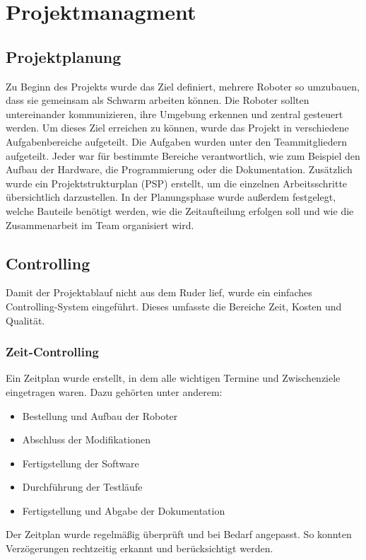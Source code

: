 \section{Projektmanagment}
\label{subsec:projektmanagment}
%
\subsection{Projektplanung}
%

Zu Beginn des Projekts wurde das Ziel definiert, mehrere Roboter so umzubauen, dass sie gemeinsam als Schwarm arbeiten können. Die Roboter sollten untereinander kommunizieren, ihre Umgebung erkennen und zentral gesteuert werden. Um dieses Ziel erreichen zu können, wurde das Projekt in verschiedene Aufgabenbereiche aufgeteilt.
Die Aufgaben wurden unter den Teammitgliedern aufgeteilt. Jeder war für bestimmte Bereiche verantwortlich, wie zum Beispiel den Aufbau der Hardware, die Programmierung oder die Dokumentation.
Zusätzlich wurde ein Projektstrukturplan (PSP) erstellt, um die einzelnen Arbeitsschritte übersichtlich darzustellen.
In der Planungsphase wurde außerdem festgelegt, welche Bauteile benötigt werden, wie die Zeitaufteilung erfolgen soll und wie die Zusammenarbeit im Team organisiert wird.
\subsection{Controlling}
Damit der Projektablauf nicht aus dem Ruder lief, wurde ein einfaches Controlling-System eingeführt. Dieses umfasste die Bereiche Zeit, Kosten und Qualität.
\subsubsection{Zeit-Controlling}
Ein Zeitplan wurde erstellt, in dem alle wichtigen Termine und Zwischenziele eingetragen waren.
Dazu gehörten unter anderem:
\begin{itemize}
    \item Bestellung und Aufbau der Roboter
    \item Abschluss der Modifikationen
    \item Fertigstellung der Software
    \item Durchführung der Testläufe
    \item Fertigstellung und Abgabe der Dokumentation
\end{itemize}
Der Zeitplan wurde regelmäßig überprüft und bei Bedarf angepasst. So konnten Verzögerungen rechtzeitig erkannt und berücksichtigt werden.
